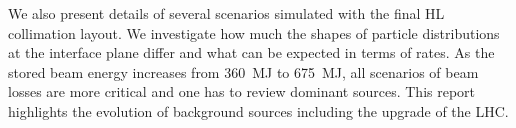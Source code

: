 We also present details of several scenarios simulated with the final HL collimation layout. We investigate how much the shapes of particle distributions at the interface plane differ and what can be expected in terms of rates. As the stored beam energy increases from 360~MJ to 675~MJ, all scenarios of beam losses are more critical and one has to review dominant sources. This report highlights the evolution of background sources including the upgrade of the LHC.

